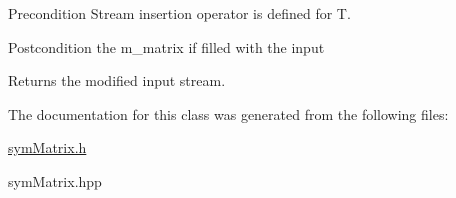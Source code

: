 \begin{DoxyPrecond}{Precondition}
Stream insertion operator is defined for {\ttfamily T}. 
\end{DoxyPrecond}
\begin{DoxyPostcond}{Postcondition}
the m\+\_\+matrix if filled with the input 
\end{DoxyPostcond}
\begin{DoxyReturn}{Returns}
the modified input stream. 
\end{DoxyReturn}


The documentation for this class was generated from the following files\+:\begin{DoxyCompactItemize}
\item 
\hyperlink{symMatrix_8h}{sym\+Matrix.\+h}\item 
sym\+Matrix.\+hpp\end{DoxyCompactItemize}
